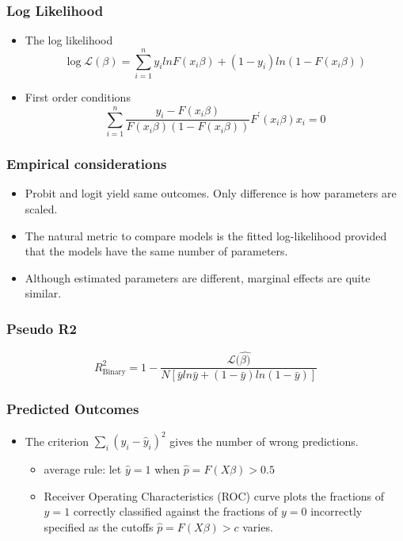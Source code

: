 \documentclass{beamer}
\newcommand{\Lik}{\mathcal{L}}
\newcommand{\1}{\mathbb{1}}
\begin{document}
\begin{frame}\frametitle{Log Likelihood}

\begin{itemize}
\item The log likelihood
\begin{equation}
\log \Lik(\beta) = \sum_{i=1}^n y_i ln F(x_i \beta) + (1-y_i) ln(1-F(x_i \beta))
\end{equation}
\item First order conditions
\begin{equation}
\sum_{i=1}^{n} \dfrac{y_i - F(x_i\beta)}{F(x_i \beta) (1-F(x_i \beta))} F^{'}(x_i \beta)x_i =0
\end{equation}
\end{itemize}
\end{frame}

\begin{frame}\frametitle{Empirical considerations}
\begin{itemize}
\item Probit and logit yield same outcomes. Only difference is how parameters are scaled.
\item The natural metric to compare models is the fitted log-likelihood provided that the models have the same number of parameters.
\item Although estimated parameters are different, marginal effects are quite similar. 
\end{itemize}
\end{frame}

\begin{frame}\frametitle{Pseudo R2}
\begin{equation}
R^2_{\text{Binary}} =  1-  \dfrac{\Lik(\hat{\beta)}}{N[\bar{y} ln \bar{y} + (1-\bar{y}) ln(1-\bar{y})]}
\end{equation}
\end{frame}

\begin{frame}\frametitle{Predicted Outcomes}
\begin{itemize}
\item The criterion $\sum_i(y_i - \hat{y}_i)^2$ gives the number of wrong predictions. 
\begin{itemize}
\item average rule: let $\hat{y}=1$ when $\hat{p} = F(X\beta)>0.5$
\item Receiver Operating Characteristics (ROC) curve plots the fractions of $y=1$ correctly classified against the fractions of $y=0$ incorrectly specified as the cutoffs $\hat{p} = F(X\beta)>c$ varies. 
\end{itemize}
\end{itemize}
\end{frame}
\end{document}

